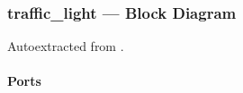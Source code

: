 \documentclass[letterpaper,10pt,english]{sphinxmanual}
\begin{document}
\sphinxstepscope


\subsubsection{traffic\_light — Block Diagram}
\label{\detokenize{modules/traffic_light/block:traffic-light-block-diagram}}\label{\detokenize{modules/traffic_light/block::doc}}
\sphinxAtStartPar
Auto\sphinxhyphen{}extracted from .



\paragraph{Ports}
\label{\detokenize{modules/traffic_light/block:ports}}
\end{document}
